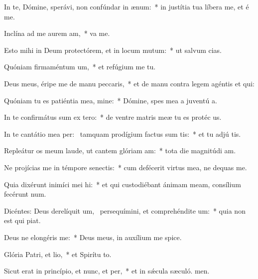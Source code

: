 \item In te, Dómine, sperávi, non confúndar in ænum:~* in justítia tua líbera me, et é me.
\item Inclína ad me aurem am,~*  va me.
\item Esto mihi in Deum protectórem, et in locum mutum:~* ut salvum  cias.
\item Quóniam firmaméntum um,~* et refúgium me  tu.
\item Deus meus, éripe me de manu peccaris,~* et de manu contra legem agéntis et qui:
\item Quóniam tu es patiéntia mea, mine:~* Dómine, spes mea a juventú a.
\item In te confirmátus sum ex tero:~* de ventre matris meæ tu es protéc us.
\item In te cantátio mea per:~\pscross{} tamquam prodígium factus sum tis:~* et tu adjú tis.
\item Repleátur os meum laude, ut cantem glóriam am:~* tota die magnitúdi am.
\item Ne projícias me in témpore senectis:~* cum defécerit virtus mea, ne dequas me.
\item Quia dixérunt inimíci mei hi:~* et qui custodiébant ánimam meam, consílium fecérunt  num.
\item Dicéntes: Deus derelíquit um,~\pscross{} persequímini, et comprehéndite um:~* quia non est qui piat.
\item Deus ne elongéris  me:~* Deus meus, in auxílium me spice.
\item Glória Patri, et lio,~* et Spirítu to.
\item Sicut erat in princípio, et nunc, et per,~* et in sǽcula sæculó. men.
